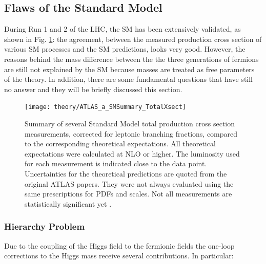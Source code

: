 		\subsection{Flaws of the Standard Model}
		\label{sec:SMlim}

			During Run 1 and 2 of the LHC, the SM has been extensively validated, as shown in Fig. \ref{fig:ATLAS_a_SMSummary_TotalXsect}: the agreement, between the measured production cross section of various SM processes and the SM predictions, looks very good. However, the reasons behind the mass difference between the the three generations of fermions are still not explained by the SM because masses are treated as free parameters of the theory. In addition, there are some fundamental questions that have still no answer and they will be briefly discussed this section.

			\begin{figure}[!htb]
				\centering
				\texttt{[image: theory/ATLAS\_a\_SMSummary\_TotalXsect]}
				\caption{\label{fig:ATLAS_a_SMSummary_TotalXsect} Summary of several Standard Model total production cross section measurements, corrected for leptonic branching fractions, compared to the corresponding theoretical expectations. All theoretical expectations were calculated at NLO or higher. The luminosity used for each measurement is indicated close to the data point. Uncertainties for the theoretical predictions are quoted from the original ATLAS papers. They were not always evaluated using the same prescriptions for PDFs and scales. Not all measurements are statistically significant yet \cite{ATLAS_a_SMSummary_TotalXsect}.}
			\end{figure}



		\subsubsection*{Hierarchy Problem}

			Due to the coupling of the Higgs field to the fermionic fields the one-loop corrections to the Higgs mass receive several contributions. In particular: 


